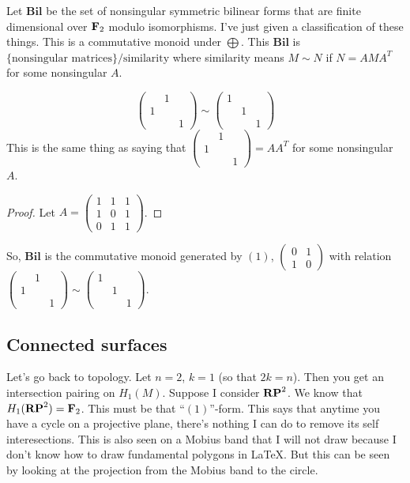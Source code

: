 Let $\mathbf{Bil}$ be the set of nonsingular symmetric bilinear forms that are finite dimensional over $\mathbf F_2$ modulo isomorphisms. I've just given a classification of these things. This is a commutative monoid under $\bigoplus$. This $\mathbf{Bil}$ is $\{\text{nonsingular matrices}\}/\text{similarity}$ where similarity means $M\sim N$ if $N=AMA^T$ for some nonsingular $A$.
\begin{claim}
\begin{equation*}
\begin{pmatrix}
 & 1 & \\
1 & & \\
 & & 1
\end{pmatrix}
\sim
\begin{pmatrix}
1 & & \\
& 1 & \\
& & 1
\end{pmatrix}
\end{equation*}
This is the same thing as saying that $\begin{pmatrix}
 & 1 & \\
1 & & \\
 & & 1
\end{pmatrix}=AA^T$ for some nonsingular $A$.
\end{claim}
\begin{proof}
Let $A=\begin{pmatrix}1 & 1 & 1 \\ 1 & 0 & 1 \\ 0 & 1 & 1 \end{pmatrix}$.
\end{proof}
So, $\mathbf{Bil}$ is the commutative monoid generated by $(1)$, $\begin{pmatrix}0 & 1 \\ 1 & 0\end{pmatrix}$ with relation $\begin{pmatrix}
 & 1 & \\
1 & & \\
 & & 1
\end{pmatrix}
\sim
\begin{pmatrix}
1 & & \\
& 1 & \\
& & 1
\end{pmatrix}$.
\subsection{Connected surfaces}
Let's go back to topology. Let $n=2$, $k=1$ (so that $2k=n$). Then you get an intersection pairing on $ H_1(M)$. Suppose I consider $\mathbf{RP}^2$. We know that $ H_1(\mathbf{RP}^2)=\mathbf F_2$. This must be that ``$(1)$''-form. This says that anytime you have a cycle on a projective plane, there's nothing I can do to remove its self interesections. This is also seen on a Mobius band that I will not draw because I don't know how to draw fundamental polygons in LaTeX. But this can be seen by looking at the projection from the Mobius band to the circle.

